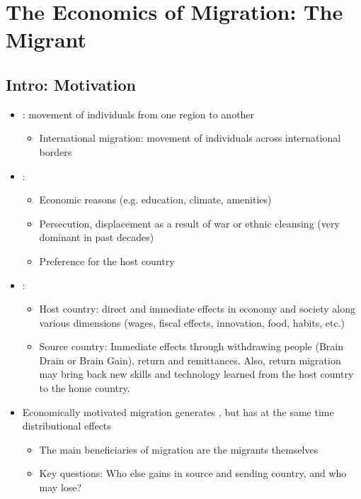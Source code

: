 \chapter{The Economics of Migration: The Migrant}


\section{Intro: Motivation}
\begin{itemize}
    \item {}: movement of individuals from one region to another
    \begin{itemize}
    \item International migration: movement of individuals across international borders
    \end{itemize}
    
    \item {}: 
    \begin{itemize}
    \item Economic reasons (e.g. education, climate, amenities)
    \item Persecution, displacement as a result of war or ethnic cleansing (very dominant in past decades)
    \item Preference for the host country 
    \end{itemize}
    
    \item {}:
    \begin{itemize}
    \item Host country: direct and immediate effects in economy and society along various dimensions (wages, fiscal effects, innovation, food, habits, etc.)
    \item Source country: Immediate effects through withdrawing people (Brain Drain or Brain Gain), return and remittances. Also, return migration may bring back new skills and technology learned from the host country to the home country.
    \end{itemize}
    
    \item Economically motivated migration generates , but has at the same time distributional effects
    \begin{itemize}
    \item The main beneficiaries of migration are the migrants themselves
    \item Key questions: Who else gains in source and sending country, and who may lose?
    \end{itemize}
    
\end{itemize}


